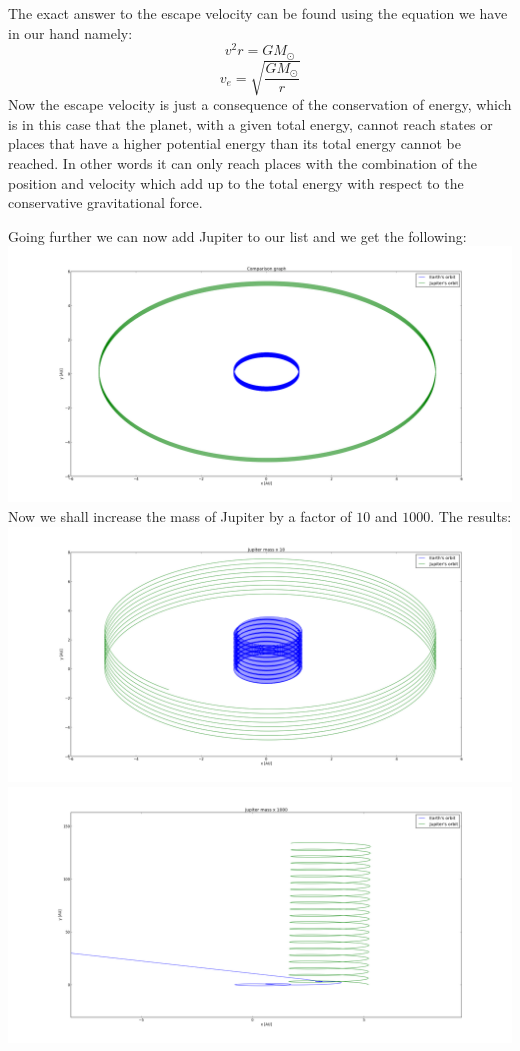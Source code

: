 \documentclass{article}
\begin{document}
The exact answer to the escape velocity can be found using the equation we have in our hand namely:
$$v^2r = GM_{\odot}$$
$$v_e = \sqrt{\frac{GM_\odot}{r}}$$
Now the escape velocity is just a consequence of the conservation of energy, which is in this case that the planet, with a given total energy, cannot reach states or places that have a higher potential energy than its total energy cannot be reached. In other words it can only reach places with the combination of the position and velocity which add up to the total energy with respect to the conservative gravitational force.

Going further we can now add Jupiter to our list and we get the following:\\
\includegraphics[scale=0.3]{figure_3.png}\\
Now we shall increase the mass of Jupiter by a factor of $10$ and $1000$. The results:\\
\includegraphics[scale=0.3]{figure_4.png}\\
\includegraphics[scale=0.3]{figure_5.png}\\
\end{document}
